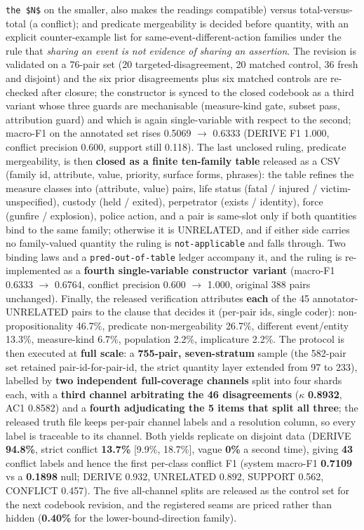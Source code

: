 \begin{itemize}
\texttt{the \$N\$} on the smaller, also makes the readings compatible) versus total-versus-total (a conflict); and predicate mergeability is decided before quantity, with an explicit counter-example list for same-event-different-action families under the rule that \emph{sharing an event is not evidence of sharing an assertion}. The revision is validated on a 76-pair set (20 targeted-disagreement, 20 matched control, 36 fresh and disjoint) and the six prior disagreements plus six matched controls are re-checked after closure; the constructor is synced to the closed codebook as a third variant whose three guards are mechanisable (measure-kind gate, subset pass, attribution guard) and which is again single-variable with respect to the second; macro-F1 on the annotated set rises 0.5069 $\to$ 0.6333 (DERIVE F1 1.000, conflict precision 0.600, support still 0.118). The last unclosed ruling, predicate mergeability, is then \textbf{closed as a finite ten-family table} released as a CSV (family id, attribute, value, priority, surface forms, phrases): the table refines the measure classes into (attribute, value) pairs, life status (fatal / injured / victim-unspecified), custody (held / exited), perpetrator (exists / identity), force (gunfire / explosion), police action, and a pair is same-slot only if both quantities bind to the same family; otherwise it is UNRELATED, and if either side carries no family-valued quantity the ruling is \texttt{not-applicable} and falls through. Two binding laws and a \texttt{pred-out-of-table} ledger accompany it, and the ruling is re-implemented as a \textbf{fourth single-variable constructor variant} (macro-F1 0.6333 $\to$ 0.6764, conflict precision 0.600 $\to$ 1.000, original 388 pairs unchanged). Finally, the released verification attributes \textbf{each} of the 45 annotator-UNRELATED pairs to the clause that decides it (per-pair ids, single coder): non-propositionality 46.7\%, predicate non-mergeability 26.7\%, different event/entity 13.3\%, measure-kind 6.7\%, population 2.2\%, implicature 2.2\%. The protocol is then executed at \textbf{full scale}: a \textbf{755-pair, seven-stratum} sample (the 582-pair set retained pair-id-for-pair-id, the strict quantity layer extended from 97 to 233), labelled by \textbf{two independent full-coverage channels} split into four shards each, with a \textbf{third channel arbitrating the 46 disagreements} ($\kappa$ \textbf{0.8932}, AC1 0.8582) and a \textbf{fourth adjudicating the 5 items that split all three}; the released truth file keeps per-pair channel labels and a resolution column, so every label is traceable to its channel. Both yields replicate on disjoint data (DERIVE \textbf{94.8\%}, strict conflict \textbf{13.7\%} [9.9\%, 18.7\%], vague \textbf{0\%} a second time), giving \textbf{43} conflict labels and hence the first per-class conflict F1 (system macro-F1 \textbf{0.7109} vs a \textbf{0.1898} null; DERIVE 0.932, UNRELATED 0.892, SUPPORT 0.562, CONFLICT 0.457). The five all-channel splits are released as the control set for the next codebook revision, and the registered seams are priced rather than hidden (\textbf{0.40\%} for the lower-bound-direction family).

\end{itemize}
